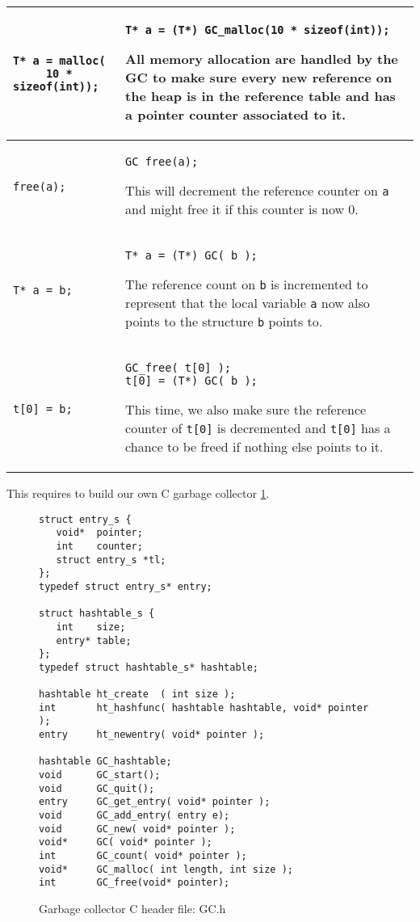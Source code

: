 \documentclass[12pt,a4paper]{article}
\newcommand{\cl}[1]{\texttt{#1}}
\begin{document}
\begin{tabular}{|p{5cm}|p{11cm}|}
\hline
\begin{lstlisting}
T* a = malloc(
     10 * sizeof(int));
\end{lstlisting} & \begin{lstlisting}
T* a = (T*) GC_malloc(10 * sizeof(int));
\end{lstlisting}
All memory allocation are handled by the GC to make sure every new reference on the heap is in the reference table and has a pointer counter associated to it.
\\ \hline
\begin{lstlisting}
free(a);
\end{lstlisting} & \begin{lstlisting}
GC_free(a);
\end{lstlisting}
This will decrement the reference counter on \cl{a} and might free it if this counter is now 0. \\ \hline
\begin{lstlisting}
T* a = b;
\end{lstlisting} & \begin{lstlisting}
T* a = (T*) GC( b );
\end{lstlisting}
The reference count on \cl{b} is incremented to represent that the local variable \cl{a} now also points to the structure \cl{b} points to.\\ \hline
\begin{lstlisting}
t[0] = b;
\end{lstlisting} & \begin{lstlisting}
GC_free( t[0] );
t[0] = (T*) GC( b );
\end{lstlisting}
This time, we also make sure the reference counter of \cl{t[0]} is decremented and \cl{t[0]} has a chance to be freed if nothing else points to it.\\ \hline
\end{tabular}

This requires to build our own C garbage collector \ref{fig:GC.h}.

\begin{figure}
\begin{lstlisting}
struct entry_s {
   void*  pointer;
   int    counter;
   struct entry_s *tl;
};
typedef struct entry_s* entry;

struct hashtable_s {
   int    size;
   entry* table;	
}; 
typedef struct hashtable_s* hashtable;

hashtable ht_create  ( int size );
int       ht_hashfunc( hashtable hashtable, void* pointer );
entry     ht_newentry( void* pointer );

hashtable GC_hashtable;
void      GC_start();
void      GC_quit();
entry     GC_get_entry( void* pointer );
void      GC_add_entry( entry e);
void      GC_new( void* pointer );
void*     GC( void* pointer );
int       GC_count( void* pointer );
void*     GC_malloc( int length, int size );
int       GC_free(void* pointer);
\end{lstlisting}
\caption{Garbage collector C header file: GC.h}
\label{fig:GC.h}
\end{figure}
\end{document}
